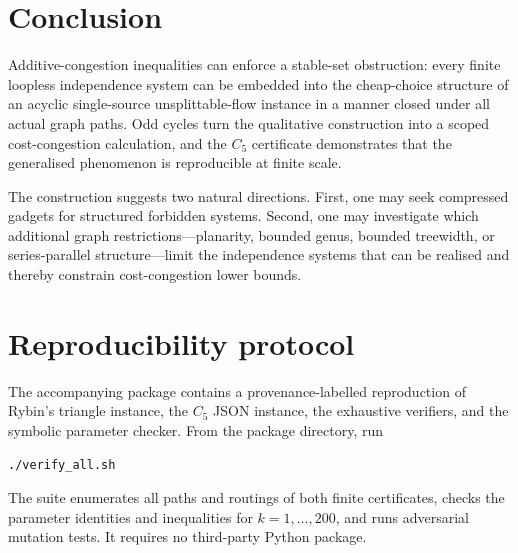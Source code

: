 \documentclass[11pt]{article}
\theoremstyle{definition}
\begin{document}
\section{Conclusion}

Additive-congestion inequalities can enforce a stable-set obstruction: every finite loopless independence system can be embedded into the cheap-choice structure of an acyclic single-source unsplittable-flow instance in a manner closed under all actual graph paths. Odd cycles turn the qualitative construction into a scoped cost-congestion calculation, and the \(C_5\) certificate demonstrates that the generalised phenomenon is reproducible at finite scale.

The construction suggests two natural directions. First, one may seek compressed gadgets for structured forbidden systems. Second, one may investigate which additional graph restrictions---planarity, bounded genus, bounded treewidth, or series-parallel structure---limit the independence systems that can be realised and thereby constrain cost-congestion lower bounds.

\appendix
\section{Reproducibility protocol}

The accompanying package contains a provenance-labelled reproduction of Rybin's triangle instance, the \(C_5\) JSON instance, the exhaustive verifiers, and the symbolic parameter checker. From the package directory, run
\begin{verbatim}
./verify_all.sh
\end{verbatim}
The suite enumerates all paths and routings of both finite certificates, checks the parameter identities and inequalities for \(k=1,\ldots,200\), and runs adversarial mutation tests. It requires no third-party Python package.

\end{document}
